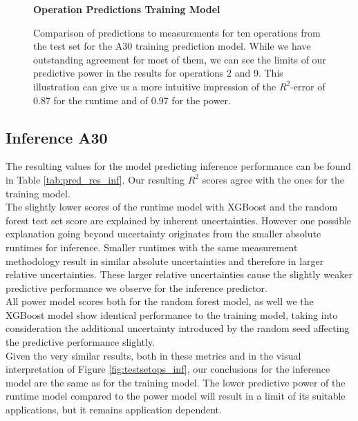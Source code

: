 \begin{figure}[htbp]
    \centering
    \parbox{1.1\textwidth}{\centering\textbf{Operation Predictions Training Model}}
    \caption{Comparison of predictions to measurements for ten operations from the test set for the A30 training prediction model. While we have outstanding agreement for most of them, we can see the limits of our predictive power in the results for operations 2 and 9. This illustration can give us a more intuitive impression of the $R^2$-error of 0.87 for the runtime and of 0.97 for the power.}
    \label{fig:testsetoperations}
\end{figure}


\subsection{Inference A30}

The resulting values for the model predicting inference performance can be found in Table \ref{tab:pred_res_inf}. Our resulting $R^2$ scores agree with the ones for the training model. \\
The slightly lower scores of the runtime model with XGBoost and the random forest test set score are explained by inherent uncertainties. However one possible explanation going beyond uncertainty originates from the smaller absolute runtimes for inference. Smaller runtimes with the same measurement methodology result in similar absolute uncertainties and therefore in larger relative uncertainties. These larger relative uncertainties cause the slightly weaker predictive performance we observe for the inference predictor.\\
All power model scores both for the random forest model, as well we the XGBoost model show identical performance to the training model, taking into consideration the additional uncertainty introduced by the random seed affecting the predictive performance slightly. \\
Given the very similar results, both in these metrics and in the visual interpretation of Figure \ref{fig:testsetops_inf}, our conclusions for the inference model are the same as for the training model. The lower predictive power of the runtime model compared to the power model will result in a limit of its suitable applications, but it remains application dependent. 



